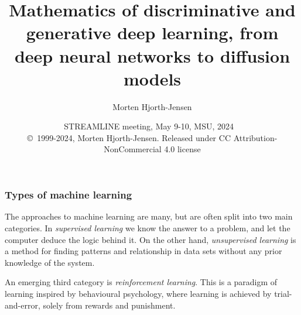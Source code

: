 \documentclass{beamer}
\begin{document}

\newcommand{\exercisesection}[1]{\subsection*{#1}}







\title{Mathematics of discriminative and generative deep learning, from deep neural networks to diffusion models}


\author{Morten Hjorth-Jensen}

\date{STREAMLINE meeting, May 9-10, MSU, 2024
\ \\ 
{\tiny \copyright\ 1999-2024, Morten Hjorth-Jensen. Released under CC Attribution-NonCommercial 4.0 license}
}

\begin{frame}
\titlepage
\end{frame}

\begin{frame}
\frametitle{Types of machine learning}

\begin{block}{}
The approaches to machine learning are many, but are often split into two main categories. 
In \emph{supervised learning} we know the answer to a problem,
and let the computer deduce the logic behind it. On the other hand, \emph{unsupervised learning}
is a method for finding patterns and relationship in data sets without any prior knowledge of the system.

An emerging  third category is  \emph{reinforcement learning}. This is a paradigm 
of learning inspired by behavioural psychology, where learning is achieved by trial-and-error, 
solely from rewards and punishment.
\end{block}
\end{frame}
\end{document}
